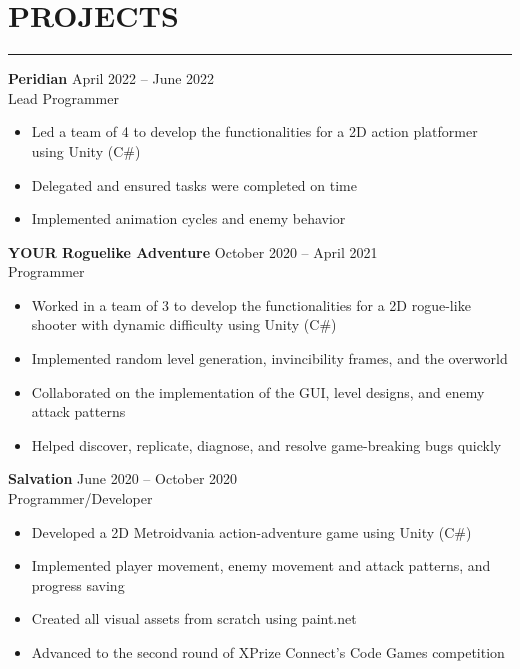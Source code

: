 \documentclass{article}
\begin{document}
\section*{PROJECTS} \vspace{-6pt} \hrule \vspace{6pt}
\textbf{Peridian} \hfill April 2022 -- June 2022\\
Lead Programmer
\begin{itemize}
	\item\vspace{-6pt} Led a team of 4 to develop the functionalities for a 2D action platformer using Unity (C$\#$)
	\item\vspace{-6pt} Delegated and ensured tasks were completed on time
	\item\vspace{-6pt} Implemented animation cycles and enemy behavior
\end{itemize}
\vspace{-6pt}
\textbf{YOUR Roguelike Adventure} \hfill October 2020 -- April 2021\\
Programmer
\begin{itemize}
	\item\vspace{-6pt} Worked in a team of 3 to develop the functionalities for a 2D rogue-like shooter with dynamic difficulty using Unity (C$\#$)
	\item\vspace{-6pt} Implemented random level generation, invincibility frames, and the overworld
	\item\vspace{-6pt} Collaborated on the implementation of the GUI, level designs, and enemy attack patterns
	\item\vspace{-6pt} Helped discover, replicate, diagnose, and resolve game-breaking bugs quickly
\end{itemize}
\vspace{-6pt}
\textbf{Salvation} \hfill June 2020 -- October 2020\\
Programmer/Developer
\begin{itemize}
	\item\vspace{-6pt} Developed a 2D Metroidvania action-adventure game using Unity (C$\#$)
	\item\vspace{-6pt} Implemented player movement, enemy movement and attack patterns, and progress saving
	\item\vspace{-6pt} Created all visual assets from scratch using paint.net
	\item\vspace{-6pt} Advanced to the second round of XPrize Connect's Code Games competition

\end{itemize}
\end{document}
